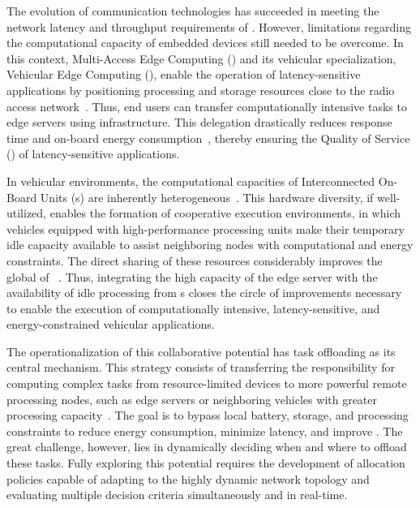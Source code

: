 The evolution of communication technologies has succeeded in meeting the network latency and throughput requirements of . However, limitations regarding the computational capacity of embedded devices still needed to be overcome. In this context, Multi-Access Edge Computing () and its vehicular specialization, Vehicular Edge Computing (), enable the operation of latency-sensitive applications by positioning processing and storage resources close to the radio access network~\cite{mao2017,miriyala2026dl_offload_review}. Thus, end users can transfer computationally intensive tasks to edge servers using   infrastructure. This delegation drastically reduces response time and on-board energy consumption~\cite{liu2019,fang2021mec_iot,long2025}, thereby ensuring the Quality of Service () of latency-sensitive applications.

In vehicular environments, the computational capacities of Interconnected On-Board Units (s) are inherently heterogeneous~\cite{luo2024}. This hardware diversity, if well-utilized, enables the formation of cooperative execution environments, in which vehicles equipped with high-performance processing units make their temporary idle capacity available to assist neighboring nodes with computational and energy constraints. The direct sharing of these resources considerably improves the global  of ~\cite{he2019d2d_mec_twc}. Thus, integrating the high capacity of the edge server with the availability of idle processing from s closes the circle of improvements necessary to enable the execution of computationally intensive, latency-sensitive, and energy-constrained vehicular applications.

The operationalization of this collaborative potential has task offloading as its central mechanism. This strategy consists of transferring the responsibility for computing complex tasks from resource-limited devices to more powerful remote processing nodes, such as edge servers or neighboring vehicles with greater processing capacity~\cite{wang2022}. The goal is to bypass local battery, storage, and processing constraints to reduce energy consumption, minimize latency, and improve . The great challenge, however, lies in dynamically deciding when and where to offload these tasks. Fully exploring this potential requires the development of allocation policies capable of adapting to the highly dynamic network topology and evaluating multiple decision criteria simultaneously and in real-time.

